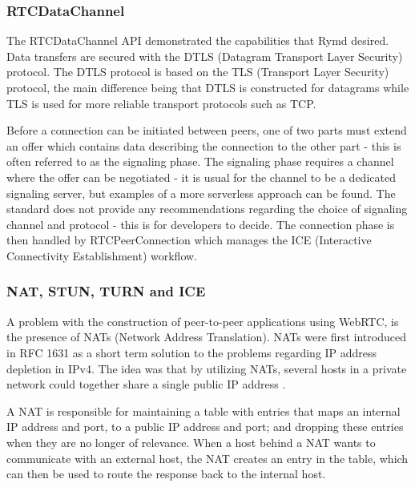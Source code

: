 \subsubsection{RTCDataChannel}
The RTCDataChannel API demonstrated the capabilities that Rymd desired. Data transfers are secured with the DTLS (Datagram Transport Layer Security) protocol. The DTLS protocol is based on the TLS (Transport Layer Security) protocol, the main difference being that DTLS is constructed for datagrams while TLS is used for more reliable transport protocols such as TCP.

Before a connection can be initiated between peers, one of two parts must extend an offer which contains data describing the connection to the other part - this is often referred to as the signaling phase. The signaling phase requires a channel where the offer can be negotiated - it is usual for the channel to be a dedicated signaling server, but examples of a more serverless approach can be found\cite{webrtcsignalserver}. The standard does not provide any recommendations regarding the choice of signaling channel and protocol - this is for developers to decide. The connection phase is then handled by RTCPeerConnection which manages the ICE (Interactive Connectivity Establishment) workflow.

\subsubsection{NAT, STUN, TURN and ICE}
A problem with the construction of peer-to-peer applications using WebRTC, is the presence of NATs (Network Address Translation). NATs were first introduced in RFC 1631 as a short term solution to the problems regarding IP address depletion in IPv4. The idea was that by utilizing NATs, several hosts in a private network could together share a single public IP address \cite{RFC1631:Online}.

A NAT is responsible for maintaining a table with entries that maps an internal IP address and port, to a public IP address and port; and dropping these entries when they are no longer of relevance. When a host behind a NAT wants to communicate with an external host, the NAT creates an entry in the table, which can then be used to route the response back to the internal host.

